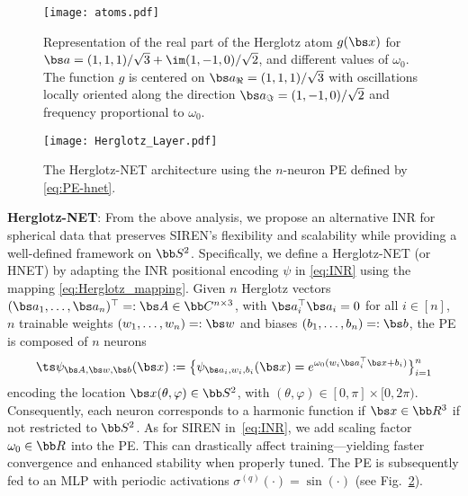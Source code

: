 \documentclass[conference]{IEEEtran}
\begin{document}
\begin{figure}[!t]
    \centering
    \texttt{[image: atoms.pdf]}
    \vspace{-1.5em}
    \caption{Representation of the real part of the Herglotz atom $g(\bs x)$ for $\bs a = (1,1,1)/\sqrt{3} + \im (1,-1,0)/\sqrt{2}$, and different values of $\omega_0$. The function $g$ is centered on $\bs a_{\Re} = (1,1,1)/\sqrt{3}$ with oscillations locally oriented along the direction $\bs a_{\Im} = (1,-1,0)/\sqrt{2}$ and frequency proportional to $\omega_0$.}
    \vspace{-1em}
    \label{fig:atoms}
\end{figure}
\begin{figure}[!ht]
    \centering
    \texttt{[image: Herglotz\_Layer.pdf]}
    \caption{The Herglotz-NET architecture using the $n$-neuron PE defined by \eqref{eq:PE-hnet}.}
    \vspace{-1em}
    \label{fig:herglotz_layer}
\end{figure}

\noindent\textbf{Herglotz-NET}: From the above analysis, we propose an alternative INR for spherical data that preserves SIREN's flexibility and scalability while providing a well-defined framework on $\bb S^2$. Specifically, we define a Herglotz-NET (or HNET) by adapting the INR positional encoding $\psi$ in \eqref{eq:INR} using the mapping \eqref{eq:Herglotz_mapping}. Given $n$ Herglotz vectors $(\bs a_1, \ldots, \bs a_n)^\top =: \bs A \in \bb C^{n\times 3}$, with $\bs a_i^\top\bs a_i=0$ for all $i \in [n]$, $n$ trainable weights $(w_1, \ldots, w_n) =: \bs w$ and biases $(b_1, \ldots, b_n) =: \bs b$, the PE is composed of $n$ neurons 
\begin{equation}
\label{eq:PE-hnet}
\ts \psi_{\bs A, \bs w, \bs b}(\bs x) := \big\{\psi_{\bs a_i, w_i, b_i}(\bs x) = e^{\omega_0 (w_i \bs a_i^\top \bs x + b_i)}\big\}_{i=1}^n    
\end{equation}
encoding the location $\bs x(\theta,\varphi) \in \bb S^2$, with $(\theta,\varphi) \in [0,\pi] \times [0, 2\pi)$.   
Consequently, each neuron corresponds to a harmonic function if $\bs x \in \bb R^3$ if not restricted to $\bb S^2$. As for SIREN in~\eqref{eq:INR}, we add scaling factor $\omega_0 \in \bb R$ into the PE. This can drastically affect training---yielding faster convergence and enhanced stability when properly tuned. The PE is subsequently fed to an MLP with periodic activations $\sigma^{(q)}(\cdot) = \sin(\cdot)$ (see Fig.~\ref{fig:herglotz_layer}). 
\end{document}
